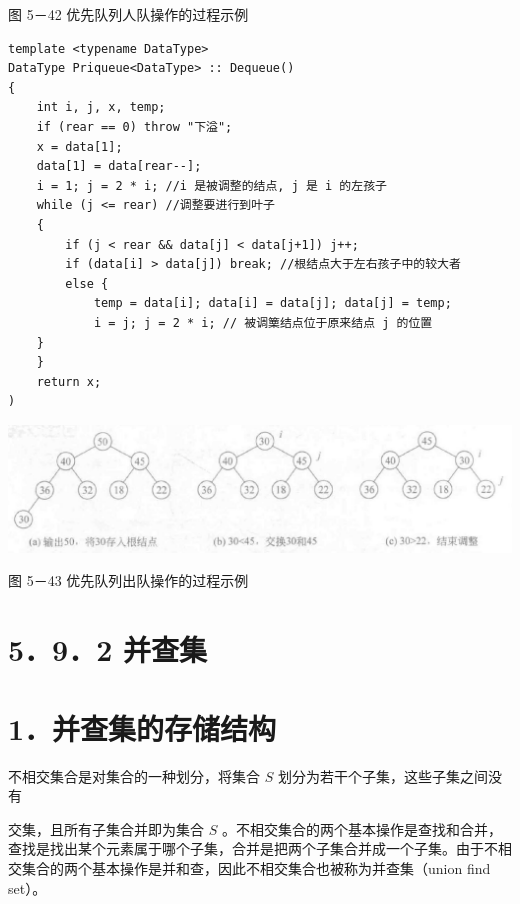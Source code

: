 \documentclass[10pt]{article}
\begin{document}
图 5－42 优先队列人队操作的过程示例

\begin{verbatim}
template <typename DataType>
DataType Priqueue<DataType> :: Dequeue()
{
    int i, j, x, temp;
    if (rear == 0) throw "下溢";
    x = data[1];
    data[1] = data[rear--];
    i = 1; j = 2 * i; //i 是被调整的结点, j 是 i 的左孩子
    while (j <= rear) //调整要进行到叶子
    {
        if (j < rear && data[j] < data[j+1]) j++;
        if (data[i] > data[j]) break; //根结点大于左右孩子中的较大者
        else {
            temp = data[i]; data[i] = data[j]; data[j] = temp;
            i = j; j = 2 * i; // 被调篥结点位于原来结点 j 的位置
    }
    }
    return x;
)
\end{verbatim}

\begin{center}
\includegraphics[max width=\textwidth]{2025_06_06_704745ea57b15b2333e5g-177}
\end{center}

图 5－43 优先队列出队操作的过程示例

\section*{5．9．2 并查集}
\section*{1．并查集的存储结构}
不相交集合是对集合的一种划分，将集合 $S$ 划分为若干个子集，这些子集之间没有

交集，且所有子集合并即为集合 $S$ 。不相交集合的两个基本操作是查找和合并，查找是找出某个元素属于哪个子集，合并是把两个子集合并成一个子集。由于不相交集合的两个基本操作是并和查，因此不相交集合也被称为并查集（union find set）。
\end{document}
